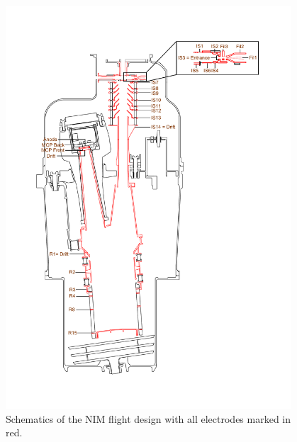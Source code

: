 		\begin{figure}[h!]
			\centering
			\includegraphics[width= 0.95\textwidth]{Setup/NIM_schema.pdf}
			\caption{Schematics of the NIM flight design with all electrodes marked in red.}
			\label{fig:MINPFMTot}
		\end{figure}
	


